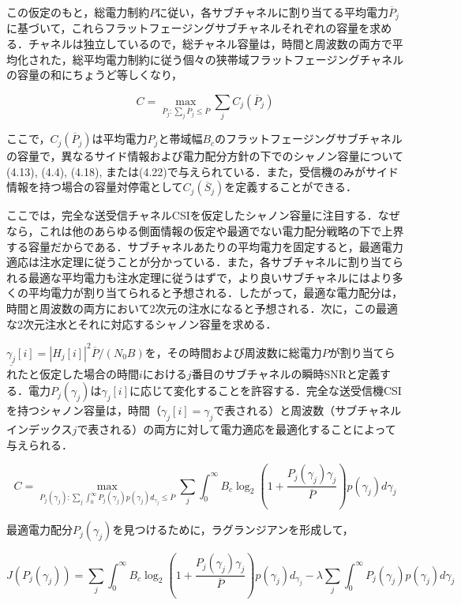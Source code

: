 \documentclass[dvipdfmx]{jsarticle}
\begin{document}
この仮定のもと，総電力制約$P$に従い，各サブチャネルに割り当てる平均電力$\overline{P}_j$に基づいて，これらフラットフェージングサブチャネルそれぞれの容量を求める．チャネルは独立しているので，総チャネル容量は，時間と周波数の両方で平均化された，総平均電力制約に従う個々の狭帯域フラットフェージングチャネルの容量の和にちょうど等しくなり，

\begin{equation}\label{}
C = \max_{{\overline{P}_j}:\sum_j \overline{P}_j \leq \overline{P}} \sum_j C_j (\overline{P}_j)
\tag{4.30}
\end{equation}

\noindent
ここで，$C_j(\overline{P}_j)$は平均電力$P_j$と帯域幅$B_c$のフラットフェージングサブチャネルの容量で，異なるサイド情報および電力配分方針の下でのシャノン容量について(4.13), (4.4), (4.18), または(4.22)で与えられている．また，受信機のみがサイド情報を持つ場合の容量対停電として$C_j(\overline{S}_j)$を定義することができる．

ここでは，完全な送受信チャネルCSIを仮定したシャノン容量に注目する．なぜなら，これは他のあらゆる側面情報の仮定や最適でない電力配分戦略の下で上界する容量だからである．サブチャネルあたりの平均電力を固定すると，最適電力適応は注水定理に従うことが分かっている．また，各サブチャネルに割り当てられる最適な平均電力も注水定理に従うはずで，より良いサブチャネルにはより多くの平均電力が割り当てられると予想される．したがって，最適な電力配分は，時間と周波数の両方において2次元の注水になると予想される．次に，この最適な2次元注水とそれに対応するシャノン容量を求める．

$\underline{\gamma_j}[i] = |H_j[i]|^2 \overline{P} / (N_0 B)$を，その時間および周波数に総電力$P$が割り当てられたと仮定した場合の時間$i$における$j$番目のサブチャネルの瞬時SNRと定義する．電力$P_j(\gamma_j)$は$\gamma_j[i]$に応じて変化することを許容する．完全な送受信機CSIを持つシャノン容量は，時間（$\gamma_j[i] = \gamma_j$で表される）と周波数（サブチャネルインデックス$j$で表される）の両方に対して電力適応を最適化することによって与えられる．

\begin{equation}\label{}
C = \max_{P_j(\gamma_j):\sum_j \int_{0}^{\infty}P_j (\gamma_j) p(\gamma_j) d_{\gamma_j} \leq \overline{P}} \sum_j \int_{0}^{\infty} B_c \log_2 (1 + \frac{P_j (\gamma_j) \gamma_j}{\overline{P}}) p(\gamma_j) d\gamma_j
\tag{4.31}
\end{equation}

\noindent
最適電力配分$P_j(\gamma_j)$を見つけるために，ラグランジアンを形成して，

\begin{equation}\label{}
J(P_j(\gamma_j)) = \sum_j \int_{0}^{\infty} B_c \log_2 (1 + \frac{P_j (\gamma_j) \gamma_j}{\overline{P}}) p(\gamma_j) d_{\gamma_j} - \lambda \sum_j \int_0^{\infty} P_j (\gamma_j) p(\gamma_j)d\gamma_j
\tag{4.32}
\end{equation}
\end{document}
